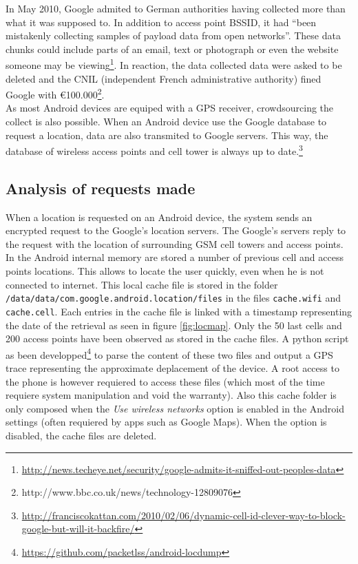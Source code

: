 \documentclass{report}
\begin{document}
In May 2010, Google admited to German authorities having collected more than what it was supposed to. In addition to access point BSSID, it had ``been mistakenly collecting samples of payload data from open networks''. These data chunks could include parts of an email, text or photograph or even the website someone may be viewing\footnote{\url{http://news.techeye.net/security/google-admits-it-sniffed-out-peoples-data}}. In reaction, the data collected data were asked to be deleted and the CNIL (independent French administrative authority) fined Google with €100.000\footnote{http://www.bbc.co.uk/news/technology-12809076}.\\

As most Android devices are equiped with a GPS receiver, crowdsourcing the collect is also possible. When an Android device use the Google database to request a location, data are also transmited to Google servers. This way, the database of wireless access points and cell tower is always up to date.\footnote{\url{http://franciscokattan.com/2010/02/06/dynamic-cell-id-clever-way-to-block-google-but-will-it-backfire/}}

\subsection{Analysis of requests made}

When a location is requested on an Android device, the system sends an encrypted request to the Google's location servers. The Google's servers reply to the request with the location of surrounding GSM cell towers and access points.\\

In the Android internal memory are stored a number of previous cell and access points locations. This allows to locate the user quickly, even when he is not connected to internet. This local cache file is stored in the folder \texttt{/data/data/com.google.android.location/files} in the files \texttt{cache.wifi} and \texttt{cache.cell}. Each entries in the cache file is linked with a timestamp representing the date of the retrieval as seen in figure \ref{fig:locmap}. Only the 50 last cells and 200 access points have been observed as stored in the cache files. A python script as been developped\footnote{\url{https://github.com/packetlss/android-locdump}} to parse the content of these two files and output a GPS trace representing the approximate deplacement of the device. A root access to the phone is however requiered to access these files (which most of the time requiere system manipulation and void the warranty). Also this cache folder is only composed when the \emph{Use wireless networks} option is enabled in the Android settings (often requiered by apps such as Google Maps). When the option is disabled, the cache files are deleted.
\end{document}
